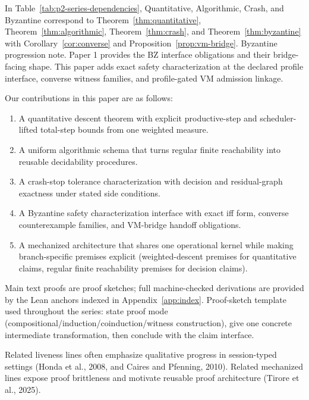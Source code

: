 \documentclass[a4paper,10pt,twocolumn,english]{article}
\numberwithin{equation}{section}
\theoremstyle{paperdef}
\theoremstyle{paperplain}
\theoremstyle{paperdef}
\theoremstyle{paperremark}
\begin{document}
In Table~\ref{tab:p2-series-dependencies}, Quantitative, Algorithmic, Crash, and Byzantine correspond to Theorem~\ref{thm:quantitative}, Theorem~\ref{thm:algorithmic}, Theorem~\ref{thm:crash}, and Theorem~\ref{thm:byzantine} with Corollary~\ref{cor:converse} and Proposition~\ref{prop:vm-bridge}.
Byzantine progression note. Paper 1 provides the BZ interface obligations and
their bridge-facing shape. This paper adds exact safety characterization at the
declared profile interface, converse witness families, and profile-gated VM
admission linkage.

Our contributions in this paper are as follows:
\begin{enumerate}
	\item A quantitative descent theorem with explicit productive-step and scheduler-lifted total-step bounds from one weighted measure.
	\item A uniform algorithmic schema that turns regular finite reachability into reusable decidability procedures.
	\item A crash-stop tolerance characterization with decision and residual-graph exactness under stated side conditions.
	\item A Byzantine safety characterization interface with exact iff form, converse counterexample families, and VM-bridge handoff obligations.
	\item A mechanized architecture that shares one operational kernel while making branch-specific premises explicit (weighted-descent premises for quantitative claims, regular finite reachability premises for decision claims).
\end{enumerate}

Main text proofs are proof sketches; full machine-checked derivations are provided by the Lean anchors indexed in Appendix~\ref{app:index}.
Proof-sketch template used throughout the series: state proof mode
(compositional/induction/coinduction/witness construction), give one concrete
intermediate transformation, then conclude with the claim interface.

Related liveness lines often emphasize qualitative progress in session-typed settings (Honda et al., 2008, and Caires and Pfenning, 2010). Related mechanized lines expose proof brittleness and motivate reusable proof architecture (Tirore et al., 2025).
\end{document}

